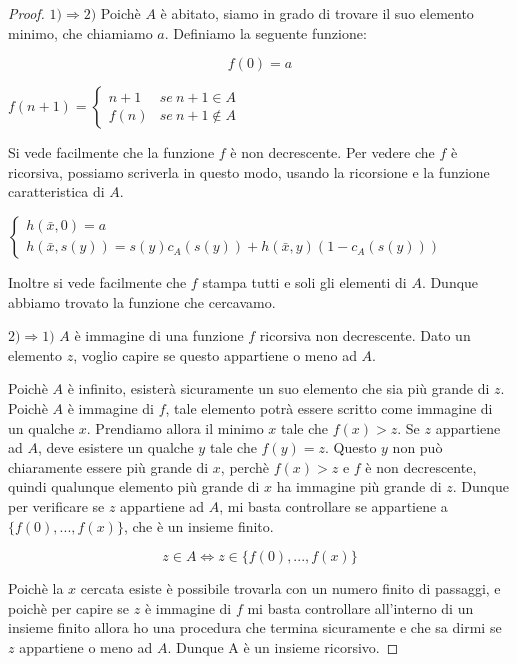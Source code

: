 \begin{proof}
$1) \Rightarrow 2)$ Poich\`e $A$ \`e abitato, siamo in grado di trovare il suo elemento minimo, che chiamiamo $a$. Definiamo la seguente funzione:

$$f(0)=a$$

$f(n+1)=\left\{ \begin{array}{cc}
n+1 & se\ n+1\in A\\
f(n) & se\ n+1\notin A\end{array}\right.$

Si vede facilmente che la funzione $f$ \`e non decrescente. Per vedere che $f$ \`e ricorsiva, possiamo scriverla in questo modo, usando la ricorsione e la funzione caratteristica di $A$.


$\left\{ \begin{array}{l}
h(\bar{x},0)=a\\
h(\bar{x},s(y))=s(y)c_A(s(y))+h(\bar{x},y)(1-c_A(s(y)))\end{array}\right.$

Inoltre si vede facilmente che $f$ stampa tutti e soli gli elementi di $A$. Dunque abbiamo trovato la funzione che cercavamo.
\bigskip

$2) \Rightarrow 1)$ $A$ \`e immagine di una funzione $f$ ricorsiva non decrescente. Dato un elemento $z$, voglio capire se questo appartiene o meno ad $A$. 

Poich\`e $A$ \`e infinito, esister\`a sicuramente un suo elemento che sia pi\`u grande di $z$. Poich\`e $A$ \`e immagine di $f$, tale elemento potr\`a essere scritto come immagine di un qualche $x$. Prendiamo allora il minimo $x$ tale che $f(x)>z$. Se $z$ appartiene ad $A$, deve esistere un qualche $y$ tale che $f(y)=z$. Questo $y$ non pu\`o chiaramente essere pi\`u grande di $x$, perch\`e $f(x)>z$ e $f$ \`e non decrescente, quindi qualunque elemento pi\`u grande di $x$ ha immagine pi\`u grande di $z$. Dunque per verificare se $z$ appartiene ad $A$, mi basta controllare se appartiene a $\{f(0),...,f(x)\}$, che \`e un insieme finito. 

$$z \in A \Longleftrightarrow z \in \{f(0),...,f(x)\}$$

Poich\`e la $x$ cercata esiste \`e possibile trovarla con un numero finito di passaggi, e poich\`e per capire se $z$ \`e immagine di $f$ mi basta controllare all'interno di un insieme finito allora ho una procedura che termina sicuramente e che sa dirmi se $z$ appartiene o meno ad $A$. Dunque A \`e un insieme ricorsivo.

\end{proof}

